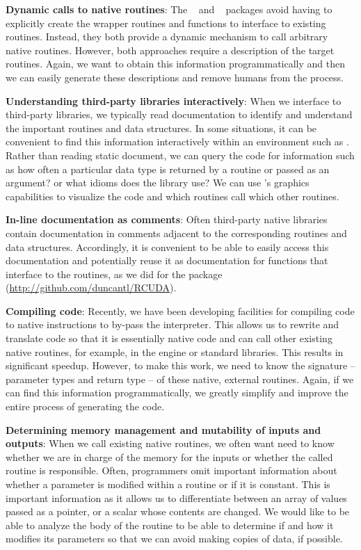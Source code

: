\documentclass[article]{jss}
\def\C{\proglang{C}}
\def\R{\proglang{R}}
\def\Rpkg#1{\pkg{#1}}
\begin{document}
\textbf{Dynamic calls to native routines}: The
\Rpkg{rdyncall}~\cite{bib:rdyncall} and \Rpkg{Rffi}~\cite{bib:Rffi}
\R{} packages avoid having to explicitly create the wrapper routines
and \R{} functions to interface to existing \C{} routines. Instead,
they both provide a dynamic mechanism to call arbitrary native
routines.  However, both approaches require a description of the
target routines.  Again, we want to obtain this information
programmatically and then we can easily generate these descriptions
and remove humans from the process.

\textbf{Understanding third-party libraries interactively}: When we
interface to third-party libraries, we typically read documentation to
identify and understand the important routines and data structures.
In some situations, it can be convenient to find this information
interactively within an environment such as \R.  Rather than reading
static document, we can query the code for information such as how
often a particular data type is returned by a routine or passed as an
argument? or what idioms does the library use?  We can use \R's
graphics capabilities to visualize the code and which routines call
which other routines.

\textbf{In-line documentation as comments}: Often third-party native
libraries contain documentation in comments adjacent to the corresponding
routines and data structures.  Accordingly, it is convenient to be able to easily
access this documentation and potentially reuse it as \R{}
documentation for functions that interface to the routines, as we did
for the \Rpkg{RCUDA} package (\url{http://github.com/duncantl/RCUDA}).

\textbf{Compiling \R{} code}: Recently, we have been developing \R{}
facilities for compiling \R{} code to native instructions to by-pass
the \R{} interpreter.  This allows us to rewrite and translate \R{}
code so that it is essentially native code and can call other existing
native routines, for example, in the \R{} engine or standard \C{}
libraries.  This results in significant speedup.  However, to make
this work, we need to know the signature -- parameter types and return
type -- of these native, external routines.  Again, if we can find
this information programmatically, we greatly simplify and improve the
entire process of generating the code.

\textbf{Determining memory management and mutability of inputs and
  outputs}: When we call existing native routines, we often want need
to know whether we are in charge of the memory for the inputs or
whether the called routine is responsible.  Often, programmers omit
important information about whether a parameter is modified within a
routine or if it is constant.  This is important information as it
allows us to differentiate between an array of values passed as a
pointer, or a scalar whose contents are changed.  We would like to be
able to analyze the body of the routine to be able to determine if and
how it modifies its parameters so that we can avoid making copies of
data, if possible.
\end{document}
